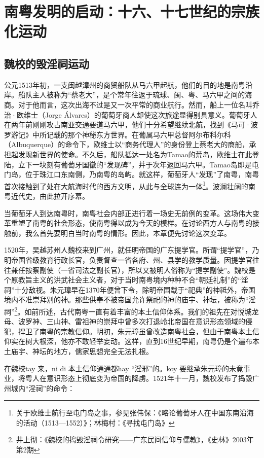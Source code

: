 \chapter{南粤发明的启动：十六、十七世纪的宗族化运动}

\section{魏校的毁淫祠运动}

公元1513年初，一支闽越漳州的商贸船队从马六甲起航，他们的目的地是南粤沿岸。船队主人被称为“蔡老大”，是个常年往返于琉球、闽、粤、马六甲之间的海商。对于他而言，这次出海不过是又一次平常的商业航行。然而，船上一位名叫乔治·欧维士（Jorge Álvares）的葡萄牙商人却使这次旅途显得别具意义。葡萄牙人在两年前刚刚攻占南亚交通要道马六甲，他们十分希望继续北航，找到《马可·波罗游记》中所记载的那个神秘东方世界。在葡属马六甲总督阿尔布科尔科（Albuquerque）的命令下，欧维士以“商务代理人”的身份登上蔡老大的商船，承担起发现新世界的使命。不久后，船队抵达一处名为Tamao的荒岛，欧维士在此登陆，立下一块刻有葡萄牙国徽的“发现碑”，并于次年返回马六甲。Tamao岛即是屯门岛，位于珠江口东南侧，乃南粤的岛屿。就这样，葡萄牙人“发现”了南粤，南粤首次接触到了处在大航海时代的西方文明，从此与全球连为一体\footnote{关于欧维士航行至屯门岛之事，参见张伟保：《略论葡萄牙人在中国东南沿海的活动（1513—1552）》；林梅村：《寻找屯门岛》}。波澜壮阔的南粤近代史，由此拉开序幕。

当葡萄牙人到达南粤时，南粤社会内部正进行着一场史无前例的变革。这场伟大变革重塑了南粤的社会形态，使南粤得以成为今天的模样。在讨论西方人与南粤的接触前，我么首先要明白当时南粤的情形。因此，本章便先讨论这次变革。

1520年，吴越苏州人魏校来到广州，就任明帝国的广东提学官。所谓“提学官”，乃明帝国省级教育行政长官，负责督查一省各府、州、县学的教学质量。因提学官往往兼任按察副使（一省司法之副长官），所以又被明人俗称为“提学副使”。魏校是个原教旨主义的洪武社会主义者，对于当时南粤境内种种不合“朝廷礼制”的“淫祠”十分敌视。朱元璋早在1370年便曾下令，除明帝国载于“祀典”的神祗外，帝国境内不准崇拜别的神。那些供奉不被帝国允许祭祀的神的庙宇、神坛，被称为“淫祠”\footnote{井上彻：《魏校的捣毁淫祠令研究——广东民间信仰与儒教》，《史林》2003年第2期}。如前所述，古代南粤一直有着丰富的本土信仰体系。我们的祖先在对悦城龙母、波罗神、三山神、雷祖神的崇拜中曾多次打退岭北帝国在意识形态领域的侵犯，捍卫了南粤的宗教信仰。明初，朱元璋虽曾改造南粤社会，但由于南粤本土信仰实在树大根深，他亦不敢轻举妄动。这样，直到16世纪早期，南粤仍是个遍布本土庙宇、神坛的地方，儒家思想完全无法扎根。 

在魏校tay 来，ni di 本土信仰通通都hay “淫邪”的。koy 要继承朱元璋的未竟事业，将粤人在意识形态上彻底变为帝国的降虏。1521年十一月，魏校发布了捣毁广州城内“淫祠”的命令：

